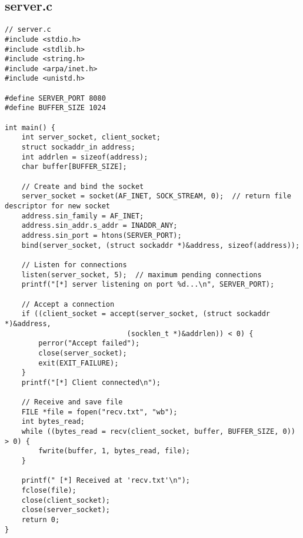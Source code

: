 \documentclass{article}
\begin{document}
\subsection{server.c}
\begin{lstlisting}
// server.c
#include <stdio.h>
#include <stdlib.h>
#include <string.h>
#include <arpa/inet.h>
#include <unistd.h>

#define SERVER_PORT 8080
#define BUFFER_SIZE 1024

int main() {
    int server_socket, client_socket;
    struct sockaddr_in address;
    int addrlen = sizeof(address);
    char buffer[BUFFER_SIZE];
    
    // Create and bind the socket
    server_socket = socket(AF_INET, SOCK_STREAM, 0);  // return file descriptor for new socket
    address.sin_family = AF_INET;
    address.sin_addr.s_addr = INADDR_ANY;
    address.sin_port = htons(SERVER_PORT);
    bind(server_socket, (struct sockaddr *)&address, sizeof(address));

    // Listen for connections
    listen(server_socket, 5);  // maximum pending connections
    printf("[*] server listening on port %d...\n", SERVER_PORT);

    // Accept a connection
    if ((client_socket = accept(server_socket, (struct sockaddr *)&address, 
                             (socklen_t *)&addrlen)) < 0) {
        perror("Accept failed");
        close(server_socket);
        exit(EXIT_FAILURE);
    }
    printf("[*] Client connected\n");

    // Receive and save file
    FILE *file = fopen("recv.txt", "wb");
    int bytes_read;
    while ((bytes_read = recv(client_socket, buffer, BUFFER_SIZE, 0)) > 0) {
        fwrite(buffer, 1, bytes_read, file);
    }

    printf(" [*] Received at 'recv.txt'\n");
    fclose(file);
    close(client_socket);
    close(server_socket);
    return 0;
}

\end{lstlisting}
\end{document}
